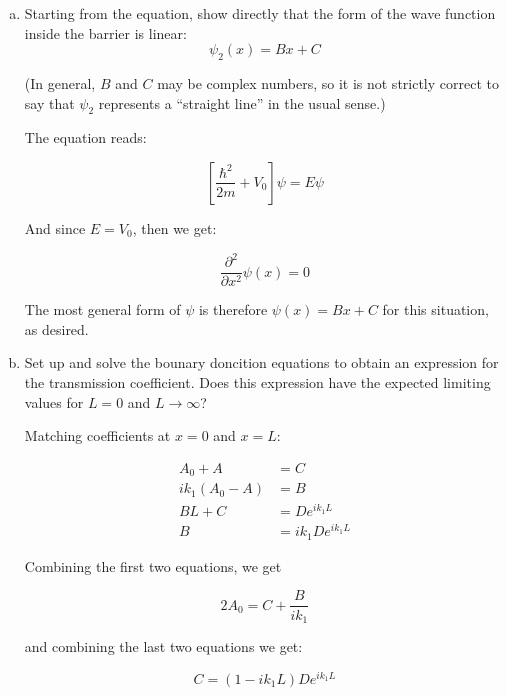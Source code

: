 \documentclass[10pt]{article}
\begin{document}
    \begin{enumerate}[(a)]
        \item Starting from the \schrodinger equation, show directly that the form of the wave function inside the barrier is linear: 
        \[ \psi_2(x) = Bx + C\]

        (In general, $B$ and $C$ may be complex numbers, so it is not strictly correct to say that $\psi_2$ represents a ``straight line'' in the usual sense.)


        \begin{solution}
            The \schrodinger equation reads: 

            \[ \left[ \frac{\hbar^2}{2m} + V_0\right] \psi = E\psi\]

            And since $E = V_0$, then we get: 

            \[ \frac{\partial^2}{\partial x^2} \psi(x) = 0\] 

            The most general form of $\psi$ is therefore $\psi(x) = Bx + C$ for this situation, as desired. 
        \end{solution}

        \item Set up and solve the bounary doncition equations to obtain an expression for the transmission coefficient. Does this expression have the expected limiting values for $L = 0$ and $L \to \infty$?
        
        \begin{solution}
            Matching coefficients at $x = 0$ and $x = L$: 

            \begin{align*}
                A_0 + A &= C\\
                ik_1(A_0 - A) &= B\\
                BL + C &= De^{ik_1L}\\
                B &= ik_1De^{ik_1L}
            \end{align*}

            Combining the first two equations, we get 

            \begin{equation} \label{eq1}
                2A_0 = C + \frac{B}{ik_1}
            \end{equation}

            and combining the last two equations we get: 

            \begin{equation} \label{eq2}
                C = (1 - ik_1L)De^{ik_1L}
            \end{equation}


\end{solution}
\end{enumerate}
\end{document}
